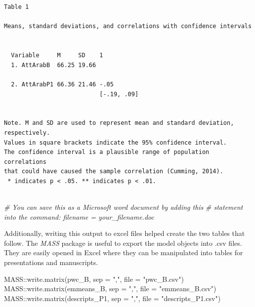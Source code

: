 \documentclass[
  11pt,
]{book}
\newenvironment{Shaded}{\begin{snugshade}}{\end{snugshade}}
\newcommand{\AttributeTok}[1]{\textcolor[rgb]{0.77,0.63,0.00}{#1}}
\newcommand{\CommentTok}[1]{\textcolor[rgb]{0.56,0.35,0.01}{\textit{#1}}}
\newcommand{\FunctionTok}[1]{\textcolor[rgb]{0.00,0.00,0.00}{#1}}
\newcommand{\NormalTok}[1]{#1}
\newcommand{\SpecialCharTok}[1]{\textcolor[rgb]{0.00,0.00,0.00}{#1}}
\newcommand{\StringTok}[1]{\textcolor[rgb]{0.31,0.60,0.02}{#1}}
\begin{document}
\begin{verbatim}


Table 1 

Means, standard deviations, and correlations with confidence intervals
 

  Variable     M     SD    1          
  1. AttArabB  66.25 19.66            
                                      
  2. AttArabP1 66.36 21.46 -.05       
                           [-.19, .09]
                                      

Note. M and SD are used to represent mean and standard deviation, respectively.
Values in square brackets indicate the 95% confidence interval.
The confidence interval is a plausible range of population correlations 
that could have caused the sample correlation (Cumming, 2014).
 * indicates p < .05. ** indicates p < .01.
 
\end{verbatim}

\begin{Shaded}
\begin{Highlighting}[]
\CommentTok{\# You can save this as a Microsoft word document by adding this}
\CommentTok{\# statement into the command: filename = \textquotesingle{}your\_filename.doc\textquotesingle{}}
\end{Highlighting}
\end{Shaded}

Additionally, writing this output to excel files helped create the two tables that follow. The \emph{MASS} package is useful to export the model objects into .csv files. They are easily opened in Excel where they can be manipulated into tables for presentations and manuscripts.

\begin{Shaded}
\begin{Highlighting}[]
\NormalTok{MASS}\SpecialCharTok{::}\FunctionTok{write.matrix}\NormalTok{(pwc\_B, }\AttributeTok{sep =} \StringTok{","}\NormalTok{, }\AttributeTok{file =} \StringTok{"pwc\_B.csv"}\NormalTok{)}
\NormalTok{MASS}\SpecialCharTok{::}\FunctionTok{write.matrix}\NormalTok{(emmeans\_B, }\AttributeTok{sep =} \StringTok{","}\NormalTok{, }\AttributeTok{file =} \StringTok{"emmeans\_B.csv"}\NormalTok{)}
\NormalTok{MASS}\SpecialCharTok{::}\FunctionTok{write.matrix}\NormalTok{(descripts\_P1, }\AttributeTok{sep =} \StringTok{","}\NormalTok{, }\AttributeTok{file =} \StringTok{"descripts\_P1.csv"}\NormalTok{)}
\end{Highlighting}
\end{Shaded}
\end{document}
